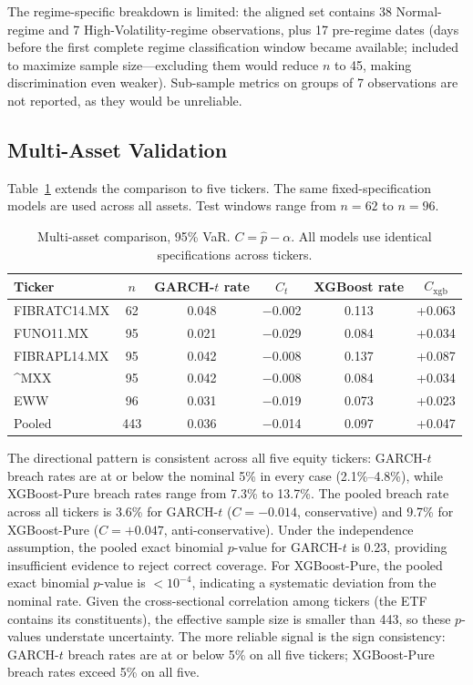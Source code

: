 \documentclass[12pt,a4paper]{article}
\begin{document}
The regime-specific breakdown is limited: the aligned set contains 38 Normal-regime and 7 High-Volatility-regime observations, plus 17 pre-regime dates (days before the first complete regime classification window became available; included to maximize sample size---excluding them would reduce $n$ to 45, making discrimination even weaker). Sub-sample metrics on groups of 7 observations are not reported, as they would be unreliable.

\subsection{Multi-Asset Validation}

Table~\ref{tab:multi} extends the comparison to five tickers. The same fixed-specification models are used across all assets. Test windows range from $n = 62$ to $n = 96$.

\begin{table}[H]
\centering
\caption{Multi-asset comparison, 95\% VaR. $C = \hat{p} - \alpha$. All models use identical specifications across tickers.}
\label{tab:multi}
\begin{tabular}{lccccc}
\toprule
Ticker & $n$ & GARCH-$t$ rate & $C_t$ & XGBoost rate & $C_{\text{xgb}}$ \\
\midrule
FIBRATC14.MX & 62  & 0.048 & $-$0.002 & 0.113 & +0.063 \\
FUNO11.MX    & 95  & 0.021 & $-$0.029 & 0.084 & +0.034 \\
FIBRAPL14.MX & 95  & 0.042 & $-$0.008 & 0.137 & +0.087 \\
\^{}MXX      & 95  & 0.042 & $-$0.008 & 0.084 & +0.034 \\
EWW          & 96  & 0.031 & $-$0.019 & 0.073 & +0.023 \\
\midrule
Pooled       & 443 & 0.036 & $-$0.014 & 0.097 & +0.047 \\
\bottomrule
\end{tabular}
\end{table}

The directional pattern is consistent across all five equity tickers: GARCH-$t$ breach rates are at or below the nominal 5\% in every case (2.1\%--4.8\%), while XGBoost-Pure breach rates range from 7.3\% to 13.7\%. The pooled breach rate across all tickers is 3.6\% for GARCH-$t$ ($C = -0.014$, conservative) and 9.7\% for XGBoost-Pure ($C = +0.047$, anti-conservative). Under the independence assumption, the pooled exact binomial $p$-value for GARCH-$t$ is 0.23, providing insufficient evidence to reject correct coverage. For XGBoost-Pure, the pooled exact binomial $p$-value is $< 10^{-4}$, indicating a systematic deviation from the nominal rate. Given the cross-sectional correlation among tickers (the ETF contains its constituents), the effective sample size is smaller than 443, so these $p$-values understate uncertainty. The more reliable signal is the sign consistency: GARCH-$t$ breach rates are at or below 5\% on all five tickers; XGBoost-Pure breach rates exceed 5\% on all five.
\end{document}
